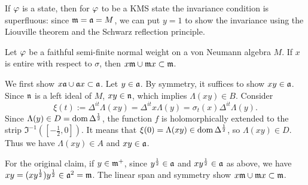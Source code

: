 \documentclass{../../small}
\begin{document}
\begin{rmk*}
If $\varphi$ is a state, then for $\varphi$ to be a KMS state the invariance condition is superfluous: since $\mathfrak{m}=\mathfrak{a}=M$, we can put $y=1$ to show the invariance using the Liouville theorem and the Schwarz reflection principle.
\end{rmk*}


\begin{lem}
Let $\varphi$ be a faithful semi-finite normal weight on a von Neumann algebra $M$.
If $x$ is entire with respect to $\sigma$, then $x\mathfrak{m}\cup\mathfrak{m} x\subset\mathfrak{m}$.
\end{lem}
\begin{pf}
We first show $x\mathfrak{a}\cup\mathfrak{a} x\subset\mathfrak{a}$.
Let $y\in\mathfrak{a}$.
By symmetry, it suffices to show $xy\in\mathfrak{a}$.
Since $\mathfrak{n}$ is a left ideal of $M$, $xy\in\mathfrak{n}$, which implies $\Lambda(xy)\in B$.
Consider
\[\xi(t):=\Delta^{it}\Lambda(xy)=\Delta^{it}x\Lambda(y)=\sigma_t(x)\Delta^{it}\Lambda(y).\]
Since $\Lambda(y)\in D=\operatorname{dom}\Delta^{\frac12}$, the function $f$ is holomorphically extended to the strip $\Im^{-1}([-\frac12,0])$.
It means that $\xi(0)=\Lambda(xy)\in\operatorname{dom}\Delta^{\frac12}$, so $\Lambda(xy)\in D$.
Thus we have $\Lambda(xy)\in A$ and $xy\in\mathfrak{a}$.

For the original claim, if $y\in\mathfrak{m}^+$, since $y^{\frac12}\in\mathfrak{a}$ and $xy^{\frac12}\in\mathfrak{a}$ as above, we have $xy=(xy^{\frac12})y^{\frac12}\in\mathfrak{a}^2=\mathfrak{m}$.
The linear span and symmetry show $x\mathfrak{m}\cup\mathfrak{m} x\subset\mathfrak{m}$.
\end{pf}
\end{document}
